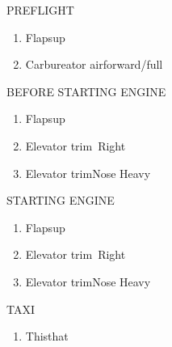 \documentclass[11pt,letterpaper,twocolumn]{article}
\newcommand*{\protitle}[1]{{\Large\sf#1}} %
\newcommand*{\proitem}[2]{\item#1\dotfill#2} %
\newenvironment*{prolist}[1]
	{\begin{center}
	\protitle{#1}
	\begin{enumerate}[noitemsep]}
	{\end{enumerate}
	\end{center}}
\begin{document}

	\begin{prolist}{PREFLIGHT}
		\proitem{Flaps}{up}
		\proitem{Carbureator air}{forward/full}
	\end{prolist}

	\begin{prolist}{BEFORE STARTING ENGINE}
		\proitem{Flaps}{up}
		\proitem{Elevator trim}{5\textdegree\ Right}
		\proitem{Elevator trim}{Nose Heavy}
	\end{prolist}

	\begin{prolist}{STARTING ENGINE}
		\proitem{Flaps}{up}
		\proitem{Elevator trim}{5\textdegree\ Right}
		\proitem{Elevator trim}{Nose Heavy}
	\end{prolist}

	\begin{prolist}{TAXI}
		\proitem{This}{that}
	\end{prolist}
\end{document}
